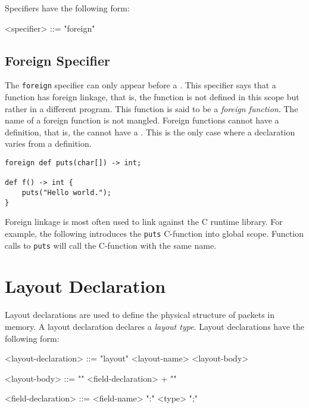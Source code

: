 Specifiers have the following form:

\begin{grammar}
\singlespace
<specifier> ::= "foreign"
\end{grammar}

\subsection{Foreign Specifier} \label{guide:foreign_spec}

The \texttt{foreign} specifier can only appear before a . This specifier says that a function has foreign linkage, that is, the function is not defined in this scope but rather in a different program. This function is said to be a \textit{foreign function}. The name of a foreign function is not mangled. Foreign functions cannot have a definition, that is, the  cannot have a . This is the only case where a declaration varies from a definition.

\begin{minip}
\begin{lstlisting}
foreign def puts(char[]) -> int;

def f() -> int {
	puts("Hello world.");
}
\end{lstlisting}
\end{minip}

Foreign linkage is most often used to link against the C runtime library. For example, the following introduces the \texttt{puts} C-function into global scope. Function calls to \texttt{puts} will call the C-function with the same name.
 
\section{Layout Declaration} \label{guide:layout}

Layout declarations are used to define the physical structure of packets in memory. A layout declaration declares a \textit{layout type}. Layout declarations have the following form:

\begin{minip}
\begin{grammar}
<layout-declaration> ::=
"layout" <layout-name> <layout-body>

<layout-body> ::=
"{"
	<field-declaration> +
"}"

<field-declaration> ::=
<field-name> ":" <type> ";"
\end{grammar}
\end{minip}

